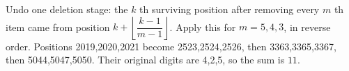 Undo one deletion stage: the $k$ th surviving position after removing every $m$ th item came from position $k+\left\lfloor\dfrac{k-1}{m-1}\right\rfloor$. Apply this for $m=5,4,3$, in reverse order. Positions 2019,2020,2021 become 2523,2524,2526, then 3363,3365,3367, then 5044,5047,5050. Their original digits are 4,2,5, so the sum is $\boxed{11}$.
